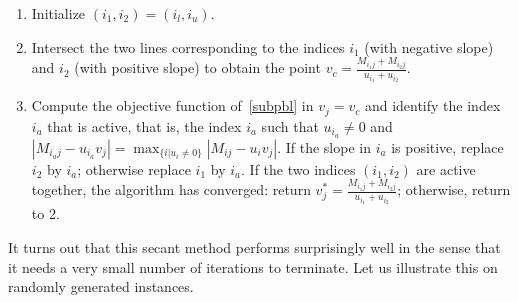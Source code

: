 \documentclass[a4paper,11pt]{article}
\numberwithin{equation}{section}
\begin{document}
\begin{enumerate}

\item Initialize $(i_1,i_2) = (i_l, i_u)$. 

\item Intersect the two lines corresponding to the indices $i_1$ (with negative slope) and $i_2$ (with positive slope) to obtain the point $v_c = \frac{M_{i_1j} + M_{i_2j}}{u_{i_1} + u_{i_2}}$. 


\item Compute the objective function of~\eqref{subpbl} in $v_j=v_c$ and identify the index $i_a$ that is active, that is, 
the index $i_a$ such that $u_{i_a}\neq 0$ and $|M_{i_a j} - u_{i_a} v_j| = \max_{ \{ i | u_i \neq 0 \} } |M_{ij} - u_i v_j|$. 
If the slope in $i_a$ is positive, replace $i_2$ by $i_a$; otherwise replace $i_1$ by $i_a$. 
If the two indices $(i_1, i_2)$ are active together, the algorithm has converged: return $v_j^* = \frac{M_{i_1j} + M_{i_2j}}{u_{i_1} + u_{i_2}}$; otherwise, return to 2. 

\end{enumerate} 

It turns out that this secant method performs surprisingly well in the sense that it needs a very small number of iterations to terminate. Let us illustrate this on randomly generated instances. 
   
\end{document}
